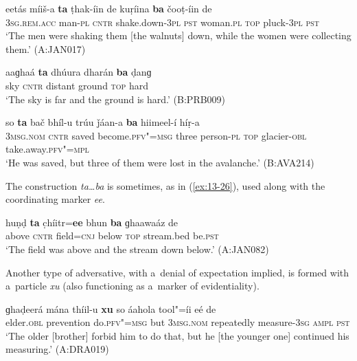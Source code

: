 \begin{exe}
\ex
\label{ex:13-23}
\gll eetás {\ob}míiš-a \textbf{ta} ṭhak-íin de kuṛíina \textbf{ba} čooṭ-íin de{\cb}\\
\textsc{3sg.rem.acc} man-\textsc{pl} \textsc{cntr} shake.down-\textsc{3pl} \textsc{pst} woman.\textsc{pl} \textsc{top} pluck-\textsc{3pl} \textsc{pst}\\
\glt `The men were shaking them [the walnuts] down, while the women were collecting them.' (A:JAN017)

\ex
\label{ex:13-24}
\gll aaɡhaá \textbf{ta} dhúura dharán \textbf{ba} ḍanɡ  \\
sky \textsc{cntr} distant ground \textsc{top} hard \\
\glt `The sky is far and the ground is hard.' (B:PRB009)

\ex
\label{ex:13-25}
\gll so \textbf{ta} bač bhíl-u trúu ǰáan-a \textbf{ba} hiimeel-í híṛ-a\\
\textsc{3msg.nom} \textsc{cntr} saved become.\textsc{pfv"=msg} three person-\textsc{pl} \textsc{top} glacier-\textsc{obl} take.away.\textsc{pfv"=mpl}  \\
\glt `He was saved, but three of them were lost in the avalanche.' (B:AVA214) 
\end{exe}

The construction \textit{ta{\ldots}ba} is sometimes, as in (\ref{ex:13-26}), used along with the coordinating marker \textit{ee}.

\begin{exe}
\ex
\label{ex:13-26}
\gll huṇḍ \textbf{ta} c̣híitr=\textbf{ee} bhun \textbf{ba} ɡhaawaáz de \\
above \textsc{cntr} field=\textsc{cnj} below \textsc{top} stream.bed be.\textsc{pst} \\
\glt `The field was above and the stream down below.' (A:JAN082) 
\end{exe}


 Another type of adversative, with a~denial of expectation implied, is formed with a~particle \textit{xu} (also functioning as a~marker of evidentiality).

\begin{exe}
\ex
\label{ex:13-27}
\gll ɡhaḍeerá mána thíil-u \textbf{xu} so áahola tool"=íi eé de\\
elder.\textsc{obl} prevention do.\textsc{pfv"=msg} but \textsc{3msg.nom} repeatedly measure-\textsc{3sg} \textsc{ampl}{\protect\footnotemark} \textsc{pst} \\
\glt `The older [brother] forbid him to do that, but he [the younger one] continued his measuring.' (A:DRA019)
\end{exe}

